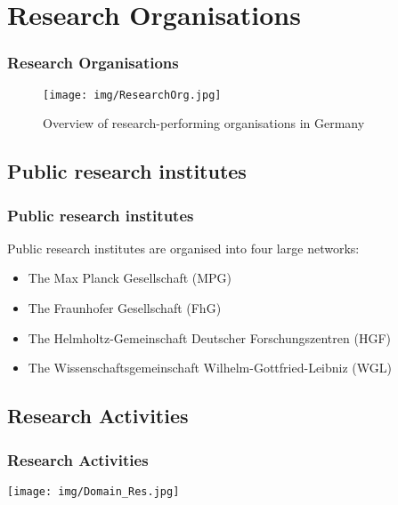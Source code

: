 \documentclass[9pt, compress]{beamer}
\begin{document}
    \section{Research Organisations}
    \begin{frame} 
        \frametitle{Research Organisations}
        \begin{figure}
        \texttt{[image: img/ResearchOrg.jpg]}
        \caption{Overview of research-performing organisations in Germany}
        \end{figure}
    \end{frame}
    \subsection{Public research institutes}
    \begin{frame} 
        \frametitle{Public research institutes}
        
            Public research institutes are  organised into four large networks:
            \begin{itemize}
            \item The Max Planck Gesellschaft (MPG) 
            \item The Fraunhofer Gesellschaft (FhG)
            \item The Helmholtz-Gemeinschaft Deutscher Forschungszentren (HGF) 
            \item The Wissenschaftsgemeinschaft Wilhelm-Gottfried-Leibniz (WGL)
        \end{itemize}
    \end{frame}
    \subsection{Research Activities}
    \begin{frame} 
            \frametitle{Research Activities}
        
            \centering
        \texttt{[image: img/Domain\_Res.jpg]}
    \end{frame}
\end{document}

